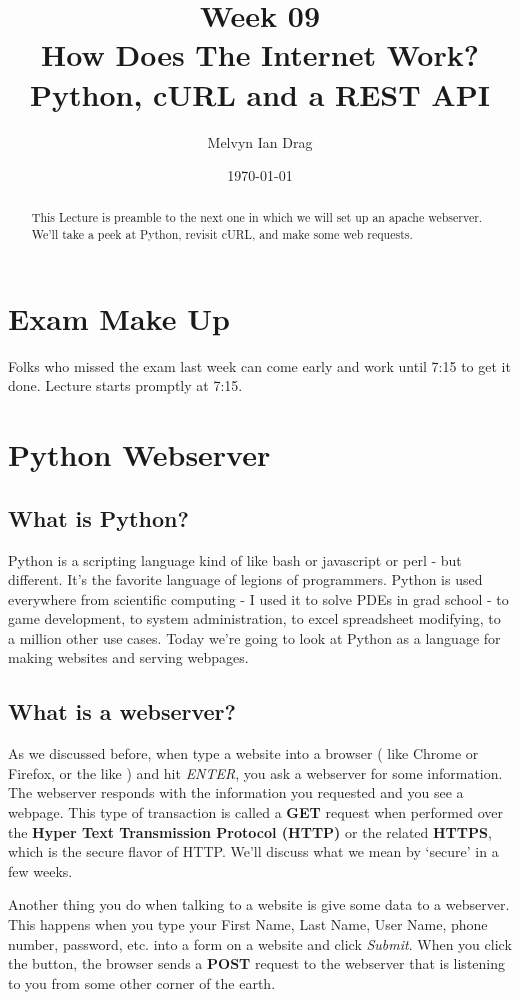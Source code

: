 \documentclass[10pt]{article}
\title{\textbf{Week 09} \\
\Large How Does The Internet Work? Python, cURL and a REST API}
\author{
	Melvyn Ian Drag
}
\date{\today}
\begin{document}
\maketitle

\begin{abstract}
This Lecture is preamble to the next one in which we will set up an apache webserver. We'll take a peek at Python, revisit cURL, and make some web requests.
\end{abstract}


\section{Exam Make Up}
Folks who missed the exam last week can come early and work until 7:15 to get it done. Lecture starts promptly at 7:15.

\section{Python Webserver}
\subsection{What is Python?}
Python is a scripting language kind of like bash or javascript or perl - but different. It's the favorite language of legions of programmers. Python is used everywhere from scientific computing - I used it to solve PDEs in grad school - to game development, to system administration, to excel spreadsheet modifying, to a million other use cases. Today we're going to look at Python as a language for making websites and serving webpages.

\subsection{What is a webserver?}
As we discussed before, when type a website into a browser ( like Chrome or Firefox, or the like ) and hit \textit{ENTER}, you ask a webserver for some information. The webserver responds with the information you requested and you see a webpage. This type of transaction is called a \textbf{GET} request when performed over the \textbf{Hyper Text Transmission Protocol (HTTP)} or the related \textbf{HTTPS}, which is the secure flavor of HTTP. We'll discuss what we mean by `secure' in a few weeks. 

Another thing you do when talking to a website is give some data to a webserver. This happens when you type your First Name, Last Name, User Name, phone number, password, etc. into a form on a website and click \textit{Submit}. When you click the button, the browser sends a \textbf{POST} request to the webserver that is listening to you from some other corner of the earth. 
\end{document}
